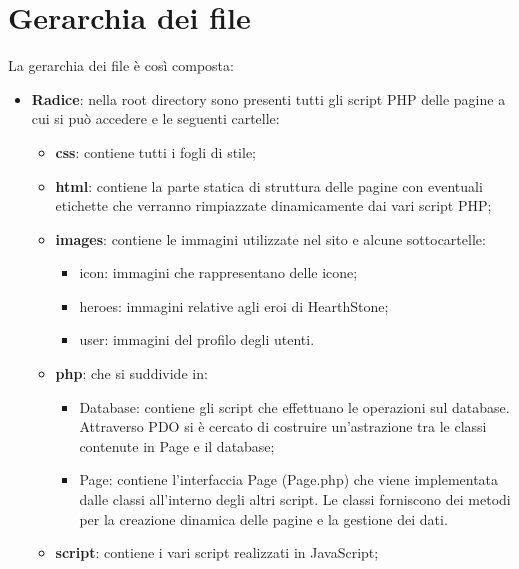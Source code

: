 \section{Gerarchia dei file}
La gerarchia dei file è così composta:
\begin{itemize}
	\item \textbf{Radice}: nella root directory sono presenti tutti gli script PHP delle pagine a cui si può accedere e le seguenti cartelle:
	\begin{itemize}
		\item \textbf{css}: contiene tutti i fogli di stile;
		\item \textbf{html}: contiene la parte statica di struttura delle pagine con eventuali etichette che verranno rimpiazzate dinamicamente dai vari script PHP;
		\item \textbf{images}: contiene le immagini utilizzate nel sito e alcune sottocartelle:
		\begin{itemize}
			\item{icon}: immagini che rappresentano delle icone;
			\item{heroes}: immagini relative agli eroi di HearthStone;
			\item{user}: immagini del profilo degli utenti.
		\end{itemize}
		\item \textbf{php}: che si suddivide in:
		\begin{itemize}
			\item {Database}: contiene gli script che effettuano le operazioni sul database. Attraverso PDO si è cercato di costruire un'astrazione tra le classi contenute in Page e il database;
			\item {Page}: contiene l'interfaccia Page (Page.php) che viene implementata dalle classi all'interno degli altri script. Le classi forniscono dei metodi per la creazione dinamica delle pagine e la gestione dei dati.
		\end{itemize}
		\item \textbf{script}: contiene i vari script realizzati in JavaScript;
	\end{itemize}
\end{itemize}


\newpage